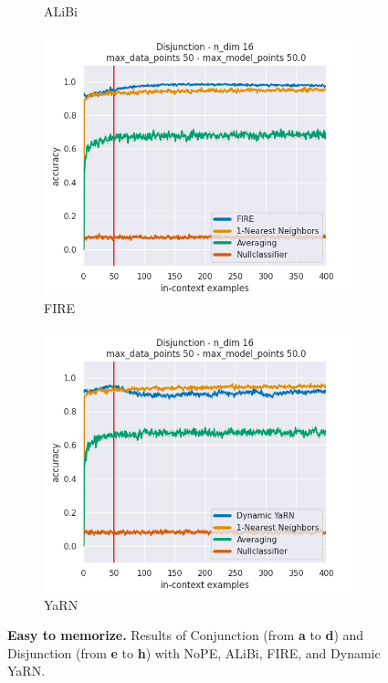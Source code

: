 \documentclass[letterpaper]{article} %
\begin{document}
\begin{figure}[tp]
\begin{subfigure}[t]{0.24\linewidth}
        \caption{ALiBi}
    \end{subfigure}
    \begin{subfigure}[t]{0.24\linewidth}
        \includegraphics[width=\linewidth]{AnonymousSubmission/LaTeX/imgs/experiments/disjunction/fire.png}
        \caption{FIRE}
    \end{subfigure}
    \begin{subfigure}[t]{0.24\linewidth}
        \includegraphics[width=\linewidth]{AnonymousSubmission/LaTeX/imgs/experiments/disjunction/dynamic-yarn.png}
        \caption{YaRN}
    \end{subfigure}
    \caption{\small\textbf{Easy to memorize.} Results of Conjunction (from \textbf{a} to \textbf{d}) and Disjunction (from \textbf{e} to \textbf{h}) with NoPE, ALiBi, FIRE, and Dynamic YaRN.}
    \label{fig:easy}
\end{figure}
\end{document}
